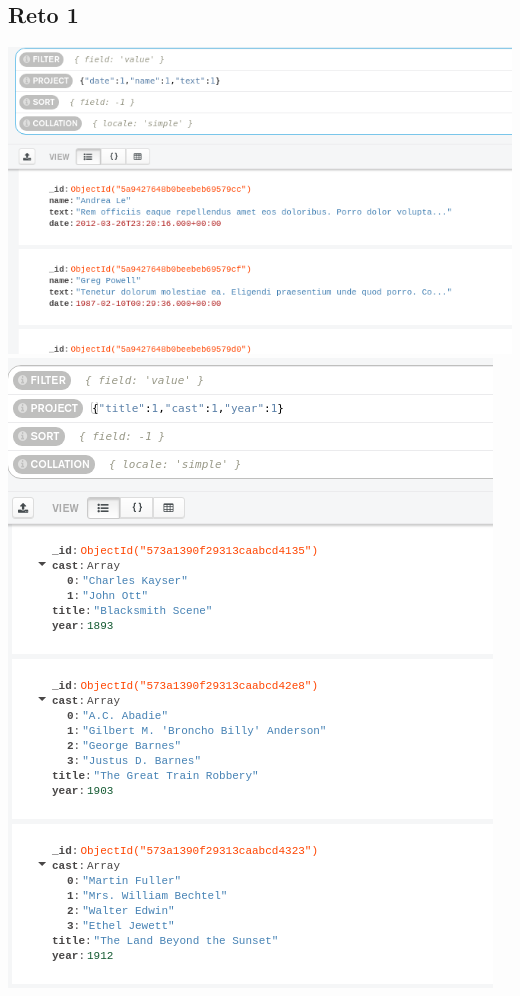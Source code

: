 \documentclass[10pt]{article}
\begin{document}
\subsection{Reto 1}
\begin{center}
  \includegraphics[scale=0.35]{imgs/e1_1.png}\\
  \includegraphics[scale=0.35]{imgs/e1_2.png}\\

\end{center}
\end{document}
